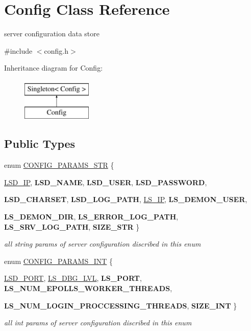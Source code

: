 \hypertarget{classConfig}{
\section{Config Class Reference}
\label{classConfig}
}


server configuration data store  




{\ttfamily \#include $<$config.h$>$}

Inheritance diagram for Config:\begin{figure}[H]
\begin{center}
\leavevmode
\includegraphics[height=2.000000cm]{classConfig}
\end{center}
\end{figure}
\subsection*{Public Types}
\begin{DoxyCompactItemize}
\item 
enum \hyperlink{classConfig_a6d78e4d65fd44d149ad6facce11bc11e}{CONFIG\_\-PARAMS\_\-STR} \{ \par
\hyperlink{classConfig_a6d78e4d65fd44d149ad6facce11bc11ea6614c7a3803a54c2a09068cbfbf6ec32}{LSD\_\-IP}, 
{\bfseries LSD\_\-NAME}, 
{\bfseries LSD\_\-USER}, 
{\bfseries LSD\_\-PASSWORD}, 
\par
{\bfseries LSD\_\-CHARSET}, 
{\bfseries LSD\_\-LOG\_\-PATH}, 
\hyperlink{classConfig_a6d78e4d65fd44d149ad6facce11bc11eab960a98d195eb36210965ccbf3822b05}{LS\_\-IP}, 
{\bfseries LS\_\-DEMON\_\-USER}, 
\par
{\bfseries LS\_\-DEMON\_\-DIR}, 
{\bfseries LS\_\-ERROR\_\-LOG\_\-PATH}, 
{\bfseries LS\_\-SRV\_\-LOG\_\-PATH}, 
{\bfseries SIZE\_\-STR}
 \}
\begin{DoxyCompactList}\small\item\em all string params of server configuration discribed in this enum \item\end{DoxyCompactList}\item 
enum \hyperlink{classConfig_a0f80a094ada73f8574e85b160a5e47b7}{CONFIG\_\-PARAMS\_\-INT} \{ \par
\hyperlink{classConfig_a0f80a094ada73f8574e85b160a5e47b7a08d4d5bb46c46b471b8af9328d91fa68}{LSD\_\-PORT}, 
\hyperlink{classConfig_a0f80a094ada73f8574e85b160a5e47b7a06836aae25f712981143e4e3653521ff}{LS\_\-DBG\_\-LVL}, 
{\bfseries LS\_\-PORT}, 
{\bfseries LS\_\-NUM\_\-EPOLLS\_\-WORKER\_\-THREADS}, 
\par
{\bfseries LS\_\-NUM\_\-LOGIN\_\-PROCCESSING\_\-THREADS}, 
{\bfseries SIZE\_\-INT}
 \}
\begin{DoxyCompactList}\small\item\em all int params of server configuration discribed in this enum \item\end{DoxyCompactList}\end{DoxyCompactItemize}
